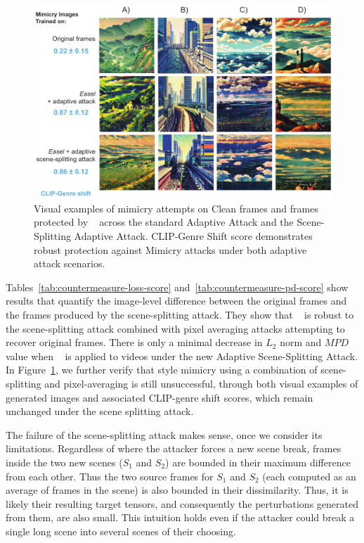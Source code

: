 \begin{figure}[t]
  \centering
  \includegraphics[width=1\columnwidth]{plots/countermeasures-eps-converted-to.pdf}
  \caption{Visual examples of mimicry attempts on Clean frames and frames
    protected by \system~ across the standard Adaptive Attack and the
    Scene-Splitting Adaptive Attack. CLIP-Genre Shift score demonstrates
    robust protection against Mimicry attacks under both adaptive attack
    scenarios.} 
  \label{fig:style-mimicry-ctr}
\end{figure}

Tables~\ref{tab:countermeasure-loss-score}
and~\ref{tab:countermeasure-pd-score} show results that quantify the
image-level difference between the original frames and the frames produced by
the scene-splitting attack. They show that \system~ is robust to the
scene-splitting attack combined with pixel averaging attacks attempting to
recover original frames. There is only a minimal decrease in $L_2$ norm and
$MPD$ value when \system~ is applied to videos under the new Adaptive
Scene-Splitting Attack. In Figure~\ref{fig:style-mimicry-ctr}, we 
further verify that style mimicry using a combination of
scene-splitting and pixel-averaging is still unsuccessful, through both
visual examples of generated images and associated CLIP-genre shift scores,
which remain unchanged under the scene splitting attack.

 The failure of the scene-splitting attack
makes sense, once we consider its limitations. Regardless of where the
attacker forces a new scene break, frames inside the two new scenes ($S_1$
and $S_2$) are bounded in their maximum difference from each other. Thus the
two source frames for $S_1$ and $S_2$ (each computed as an average of frames
in the scene) is also bounded in their dissimilarity. Thus, it is likely
their resulting target tensors, and consequently the perturbations generated
from them, are also small. This intuition holds even if the attacker could
break a single long scene into several scenes of their choosing.

